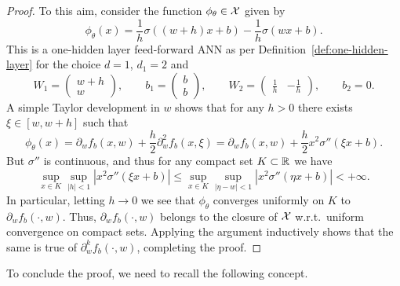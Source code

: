 \begin{proof}
    To this aim, consider the function $\phi_\theta\in \mathcal{X}$ given by  
    \begin{equation}
        \phi_{\theta}(x) = \frac{1}{h} \sigma((w+h)x + b) - \frac{1}{h}\sigma(wx+b).
    \end{equation}
    This is a one-hidden layer feed-forward ANN as per Definition~\ref{def:one-hidden-layer} for the choice $d=1$, $d_1 = 2$ and 
    \begin{equation}
        W_1 = \begin{pmatrix}
            w+h \\ w
        \end{pmatrix},
        \qquad b_1 = \begin{pmatrix}
            b \\ b
        \end{pmatrix},
        \qquad W_2=\begin{pmatrix}
            \frac{1}{h} & -\frac{1}{h}
        \end{pmatrix},
        \qquad b_2 = 0.
    \end{equation}
    A simple Taylor development in $w$ shows that for any $h>0$ there exists $\xi\in [w,w+h]$ such that
    \begin{equation}
        \phi_\theta(x) 
        = \partial_w f_b(x,w)+ \frac{h}{2}\partial_w^2 f_b(x,\xi)
        = \partial_w f_b(x,w)+\frac{h}{2}x^2\sigma''(\xi x+b).
    \end{equation}
    But $\sigma''$ is continuous, and thus for any compact set $K\subset \mathbb{R}$ we have 
    \begin{equation}
        \sup_{x\in K} \sup_{|h|<1}|x^2\sigma''(\xi x+b)| \le 
        \sup_{x\in K} \sup_{|\eta-w|<1}|x^2\sigma''(\eta x+b)| <+\infty. 
    \end{equation}
    In particular, letting $h\to 0$ we see that $\phi_\theta$ converges uniformly on $K$ to $\partial_w f_b(\cdot,w)$. Thus, $\partial_w f_b(\cdot,w)$ belongs to the closure of $\mathcal{X}$ w.r.t.~uniform convergence on compact sets.
    Applying the argument inductively shows that the same is true of $\partial_w^kf_b(\cdot,w)$, completing the proof.
\end{proof}

To conclude the proof, we need to recall the following concept.

